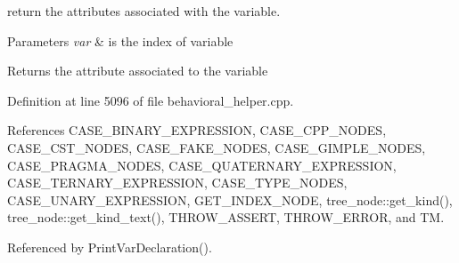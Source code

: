 return the attributes associated with the variable. 


\begin{DoxyParams}{Parameters}
{\em var} & is the index of variable \\
\hline
\end{DoxyParams}
\begin{DoxyReturn}{Returns}
the attribute associated to the variable 
\end{DoxyReturn}


Definition at line 5096 of file behavioral\+\_\+helper.\+cpp.



References C\+A\+S\+E\+\_\+\+B\+I\+N\+A\+R\+Y\+\_\+\+E\+X\+P\+R\+E\+S\+S\+I\+ON, C\+A\+S\+E\+\_\+\+C\+P\+P\+\_\+\+N\+O\+D\+ES, C\+A\+S\+E\+\_\+\+C\+S\+T\+\_\+\+N\+O\+D\+ES, C\+A\+S\+E\+\_\+\+F\+A\+K\+E\+\_\+\+N\+O\+D\+ES, C\+A\+S\+E\+\_\+\+G\+I\+M\+P\+L\+E\+\_\+\+N\+O\+D\+ES, C\+A\+S\+E\+\_\+\+P\+R\+A\+G\+M\+A\+\_\+\+N\+O\+D\+ES, C\+A\+S\+E\+\_\+\+Q\+U\+A\+T\+E\+R\+N\+A\+R\+Y\+\_\+\+E\+X\+P\+R\+E\+S\+S\+I\+ON, C\+A\+S\+E\+\_\+\+T\+E\+R\+N\+A\+R\+Y\+\_\+\+E\+X\+P\+R\+E\+S\+S\+I\+ON, C\+A\+S\+E\+\_\+\+T\+Y\+P\+E\+\_\+\+N\+O\+D\+ES, C\+A\+S\+E\+\_\+\+U\+N\+A\+R\+Y\+\_\+\+E\+X\+P\+R\+E\+S\+S\+I\+ON, G\+E\+T\+\_\+\+I\+N\+D\+E\+X\+\_\+\+N\+O\+DE, tree\+\_\+node\+::get\+\_\+kind(), tree\+\_\+node\+::get\+\_\+kind\+\_\+text(), T\+H\+R\+O\+W\+\_\+\+A\+S\+S\+E\+RT, T\+H\+R\+O\+W\+\_\+\+E\+R\+R\+OR, and TM.



Referenced by Print\+Var\+Declaration().

